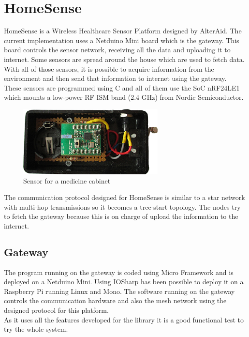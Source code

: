 \section{HomeSense}\label{S:IOEx-HomeSense}
HomeSense is a Wireless Healthcare Sensor Platform designed by AlterAid. The current implementation uses a Netduino Mini board which is the gateway. This board controls the sensor network, receiving all the data and uploading it to internet. Some sensors are spread around the house which are used to fetch data. With all of those sensors, it is possible to acquire information from the environment and then send that information to internet using the gateway.
\\
These sensors are programmed using C and all of them use the \gls{SoC} nRF24LE1 which mounts a low-power RF ISM band (2.4 GHz) from Nordic Semiconductor.
\begin{figure}[H]\begin{center}
 \centering
  \captionsetup{justification=centering}
  \includegraphics[scale=1]{pictures/examples/sensor}
  \caption{Sensor for a medicine cabinet\label{fig:IOEx-UART}}
\end{center}\end{figure}
The communication protocol designed for HomeSense is similar to a star network with multi-hop transmissions so it becomes a tree-start topology. The nodes try to fetch the gateway because this is on charge of upload the information to the internet.

\subsection{Gateway}\label{SS:IOEx-HomeSense-Gateway}
The program running on the gateway is coded using Micro Framework and is deployed on a Netduino Mini. Using IOSharp has been possible to deploy it on a Raspberry Pi running Linux and Mono. The software running on the gateway controls the communication hardware and also the mesh network using the designed protocol for this platform.
\\
As it uses all the features developed for the library it is a good functional test to try the whole system.

